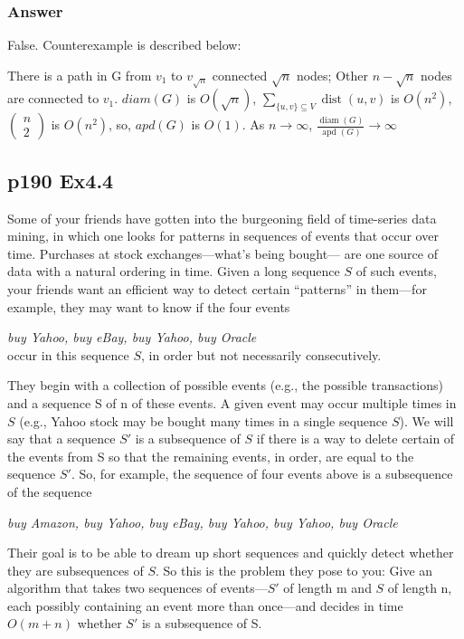 \documentclass[a4paper]{article}
\begin{document}
\subsubsection*{Answer}
False. Counterexample is described below:
\par There is a path in G from $v_1$ to $v_{\sqrt{n}}$ connected $\sqrt{n}$ nodes; Other $n-\sqrt{n}$ nodes are connected to $v_1$. $diam(G)$ is $O(\sqrt{n})$, $\sum_{\{u, v\} \subseteq V} \operatorname{dist}(u, v)$ is $O(n^2)$, $\left(\begin{array}{l}n \\ 2\end{array}\right)$ is $O(n^2)$, so, $apd(G)$ is $O(1)$. As $n \rightarrow \infty$, $\frac{\operatorname{diam}(G)}{\operatorname{apd}(G)} \rightarrow \infty$
\vspace{2cm}

\subsection*{p190 Ex4.4}
\begin{adjustwidth}{1cm}{1cm}
	Some of your friends have gotten into the burgeoning field of time-series
	data mining, in which one looks for patterns in sequences of events that
	occur over time. Purchases at stock exchanges—what’s being bought—
	are one source of data with a natural ordering in time. Given a long
	sequence $S$ of such events, your friends want an efficient way to detect
	certain “patterns” in them—for example, they may want to know if the
	four events
	\par \emph{buy Yahoo, buy eBay, buy Yahoo, buy Oracle}\\
	occur in this sequence $S$, in order but not necessarily consecutively.
	\par They begin with a collection of possible events (e.g., the possible
	transactions) and a sequence S of n of these events. A given event may
	occur multiple times in $S$ (e.g., Yahoo stock may be bought many times
	in a single sequence $S$). We will say that a sequence $S'$ is a subsequence
	of $S$ if there is a way to delete certain of the events from S so that the
	remaining events, in order, are equal to the sequence $S'$. So, for example,
	the sequence of four events above is a subsequence of the sequence
	\par \emph{buy Amazon, buy Yahoo, buy eBay, buy Yahoo, buy Yahoo,
		buy Oracle}
	\par Their goal is to be able to dream up short sequences and quickly
	detect whether they are subsequences of $S$. So this is the problem they
	pose to you: Give an algorithm that takes two sequences of events—$S'$ of
	length m and $S$ of length n, each possibly containing an event more than
	once—and decides in time $O(m + n)$ whether $S'$ is a subsequence of S.
\end{adjustwidth}
\end{document}
